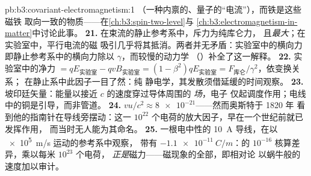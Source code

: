 \begin{solution}{pb:b3:covariant-electromagnetism:1}
（一种内禀的、量子的“电流”），而铁是这些磁铁
取向一致的物质——在\cref{ch:b3:spin-two-level}与
\cref{ch:b3:electromagnetism-in-matter}中讨论此事。
\textbf{21.} 在束流的静止参考系中，斥力为纯库仑力，
且\emph{最大}；在实验室中，平行电流的磁
吸引几乎将其抵消。两者并无矛盾：实验室中的横向力
即静止参考系中的横向力除以 $\gamma$，而较慢的动力学
（）补全了这一解释。
\textbf{22.} 实验室中的净力 $= qE_{\text{实验室}} - qvB_{\text{实验室}} =
(1 - \beta^2)qE_{\text{实验室}} = F_{\text{库仑}}/\gamma^2$，依变换关系；
在静止系中此因子一目了然：纯
静电学，其发散须借延缓的时间观察。
\textbf{23.} 坡印廷矢量：能量以接近 $c$ 的速度穿过导体周围的
\emph{场}，电子
仅起调度作用；电线中的铜是引导，而非管道。
\textbf{24.} $vu/c^2 \approx \num{8e-21}$——然而奥斯特于 1820 年
看到他的指南针在导线旁摆动：这一
$10^{22}$ 个电荷的放大因子，早在一个世纪前就已发挥作用，
而当时无人能为其命名。
\textbf{25.} 一根电中性的 \qty{10}{A} 导线，在以 \qty{e5}{m/s} 运动的参考系中观察，
带有 $\qty{-1.1e-11}{C/m}$：的 $10^{-16}$
核算差异，乘以每米 $10^{23}$ 个电荷，
\emph{正是}磁力——磁现象的全部，即相对论
以蜗牛般的速度加以审计。
\end{solution}
